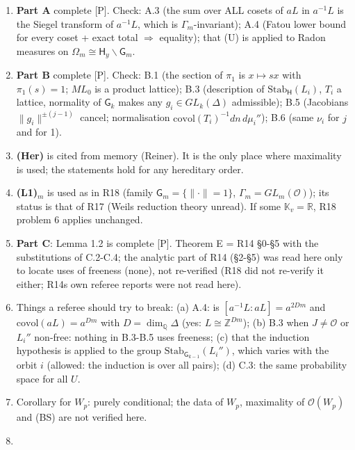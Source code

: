 \begin{enumerate}
\def\labelenumi{\arabic{enumi}.}
\tightlist
\item
  \textbf{Part A} complete {[}P{]}. Check: A.3 (the sum over ALL cosets of \(aL\) in \(a^{-1}L\) is the Siegel transform of \(a^{-1}L\), which is \(\Gamma_m\)-invariant); A.4 (Fatou lower bound for every coset + exact total \(\Rightarrow\) equality); that (U) is applied to Radon measures on \(\Omega_m\cong\mathsf H_y\backslash\mathsf G_m\).
\item
  \textbf{Part B} complete {[}P{]}. Check: B.1 (the section of \(\pi_1\) is \(x\mapsto sx\) with \(\pi_1(s)=1\); \(ML_0\) is a product lattice); B.3 (description of \(\mathrm{Stab}_{\mathsf H}(L_i)\), \(T_i\) a lattice, normality of \(\mathsf G_k\) makes any \(g_i\in GL_k(\Delta)\) admissible); B.5 (Jacobians \(\|g_i\|^{\pm(j-1)}\) cancel; normalisation \(\mathrm{covol}(T_i)^{-1}dn\,d\mu_i''\)); B.6 (same \(\nu_i\) for \(j\) and for 1).
\item
  \textbf{(Her)} is cited from memory (Reiner). It is the only place where maximality is used; the statements hold for any hereditary order.
\item
  \textbf{(L1)\(_m\)} is used as in R18 (family \(\mathsf G_m=\{\|\cdot\|=1\}\), \(\Gamma_m=GL_m(\mathcal O)\)); its status is that of R17 (Weil\textquotesingle s reduction theory unread). If some \(\mathbb K_v=\mathbb R\), R18 problem 6 applies unchanged.
\item
  \textbf{Part C}: Lemma 1.2\textquotesingle{} is complete {[}P{]}. Theorem E\textquotesingle{} = R14 §0-§5 with the substitutions of C.2-C.4; the analytic part of R14 (§2-§5) was read here only to locate uses of freeness (none), not re-verified (R18 did not re-verify it either; R14\textquotesingle s own referee reports were not read here).
\item
  Things a referee should try to break: (a) A.4: is \([a^{-1}L:aL]=a^{2Dm}\) and \(\mathrm{covol}(aL)=a^{Dm}\) with \(D=\dim_{\mathbb Q}\Delta\) (yes: \(L\cong\mathbb Z^{Dm}\)); (b) B.3 when \(J\ne\mathcal O\) or \(L_i''\) non-free: nothing in B.3-B.5 uses freeness; (c) that the induction hypothesis is applied to the group \(\mathrm{Stab}_{\mathsf G_{k-1}}(L_i'')\), which varies with the orbit \(i\) (allowed: the induction is over all pairs); (d) C.3: the same probability space for all \(U\).
\item
  Corollary for \(W_p\): purely conditional; the data of \(W_p\), maximality of \(\mathcal O(W_p)\) and (BS) are not verified here.
\item

\end{enumerate}
